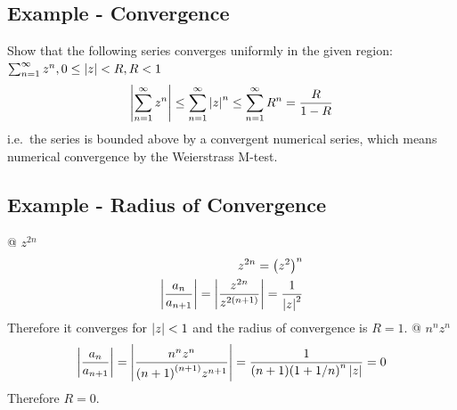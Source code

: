     \subsection{Example - Convergence}
    Show that the following series converges uniformly in the given region:
    $\sum_{n=1}^\infty z^n , 0 \le \left\lvert z \right\rvert < R , R < 1$
    \begin{align*}
        \left\lvert \sum_{n=1}^\infty z^n \right\rvert \le \sum_{n=1}^\infty \left\lvert z \right\rvert^n
        \le \sum_{n=1}^\infty R^n = \frac{R}{1-R}
    \end{align*}
    i.e.\ the series is bounded above by a convergent numerical series,
    which means numerical convergence by the Weierstrass M-test.

    \subsection{Example - Radius of Convergence}
    \begin{easylist}[itemize]
        @ $z^{2n}$
        \begin{align*}
            z^{2n} = {\left( z^2 \right)}^n\\
            \left\lvert \frac{a_n}{a_{n+1}} \right\rvert
            = \left\lvert \frac{z^{2n}}{z^{2{\left( n+1 \right)}}} \right\rvert
            = \frac{1}{\left\lvert z \right\rvert^2}
        \end{align*}
        Therefore it converges for $\left\lvert z \right\rvert < 1$ and the radius of
        convergence is $R=1$.
        @ $n^n z^n$
        \begin{align*}
            \left\lvert \frac{a_n}{a_{n+1}} \right\rvert
            = \left\lvert \frac{n^n z^n}{{\left( n+1 \right)}^{\left( n+1 \right)} z^{n+1}} \right\rvert
            = \frac{1}{{\left( n+1 \right)}{\left( 1 + 1/n \right)}^n \left\lvert z \right\rvert} = 0
        \end{align*}
        Therefore $R=0$.
    \end{easylist}
